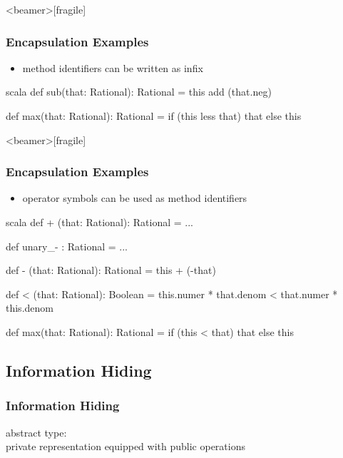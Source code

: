 \documentclass[dvipsnames]{beamer}
\theoremstyle{plain}
\begin{document}
\begin{frame}<beamer>[fragile]
  \frametitle{Encapsulation Examples}

  \begin{example}[Scala]
    \begin{itemize}
      \item method identifiers can be written as infix
    \end{itemize}

    \begin{pygments}{scala}
    def sub(that: Rational): Rational =
        this add (that.neg)

    def max(that: Rational): Rational =
        if (this less that) that else this
    \end{pygments}
  \end{example}
\end{frame}

\begin{frame}<beamer>[fragile]
  \frametitle{Encapsulation Examples}

  \begin{example}[Scala]
    \begin{itemize}
      \item operator symbols can be used as method identifiers
    \end{itemize}

    \begin{pygments}{scala}
    def + (that: Rational): Rational = ...

    def unary_- : Rational = ...

    def - (that: Rational): Rational =
        this + (-that)

    def < (that: Rational): Boolean =
        this.numer * that.denom < that.numer * this.denom

    def max(that: Rational): Rational =
        if (this < that) that else this
    \end{pygments}
  \end{example}
\end{frame}

\subsection{Information Hiding}

\begin{frame}
  \frametitle{Information Hiding}

  \begin{definition}
    \alert{abstract type}:\\
      private representation equipped with public operations
  \end{definition}
\end{frame}
\end{document}
